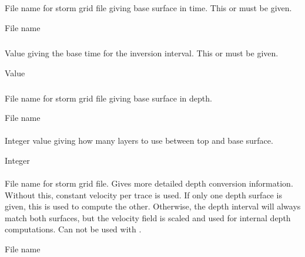 \subparagraph{} 
\slist
   \item \Description File name for storm grid file giving base surface in time. This or  must be given.
   \item \Argument File name
   \item \Default
\elist

\subparagraph{} 
\slist
   \item \Description Value giving the base time for the inversion interval. This or  must be given.
   \item \Argument Value
   \item \Default
\elist

\subparagraph{} 
\slist
   \item \Description File name for storm grid file giving base surface in depth.
   \item \Argument File name
   \item \Default
\elist


\paragraph{} 
 \slist
   \item \Description Integer value giving how many layers to use between top and base surface.
   \item \Argument Integer
   \item \Default
 \elist

\paragraph{} 
 \slist
   \item \Description File name for storm grid file. Gives more detailed depth conversion information. Without this, constant velocity per trace is used. If only one depth surface is given, this is used to compute the other. Otherwise, the depth interval will always match both surfaces, but the velocity field is scaled and used for internal depth computations. Can not be used with .
   \item \Argument File name
   \item \Default
 \elist

